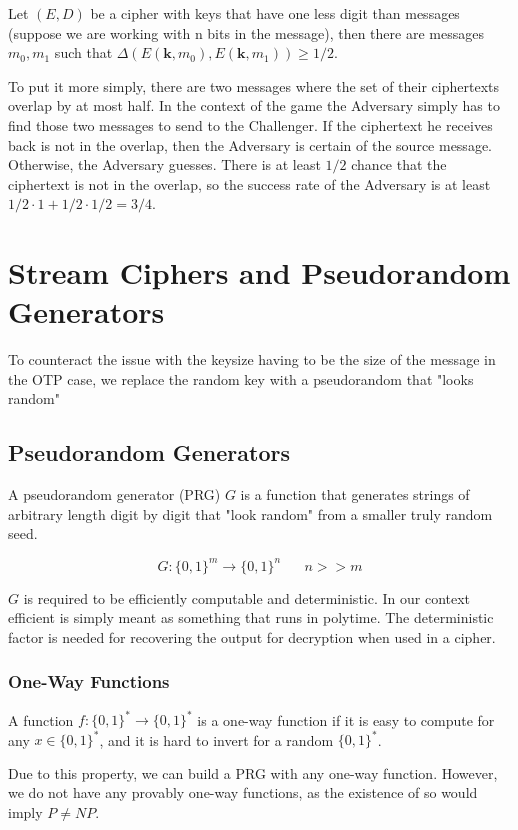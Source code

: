 \documentclass{article}
\begin{document}
\begin{multicols}{2}
Let $(E,D)$ be a cipher with keys that have one less digit than messages (suppose we are working with n bits in the message), then there are messages $m_0, m_1$ such that $\Delta(E(\mathbf{k},m_0), E(\mathbf{k},m_1)) \geq 1/2$.

To put it more simply, there are two messages where the set of their ciphertexts overlap by at most half. In the context of the game the Adversary simply has to find those two messages to send to the Challenger. If the ciphertext he receives back is not in the overlap, then the Adversary is certain of the source message. Otherwise, the Adversary guesses. There is at least $1/2$ chance that the ciphertext is not in the overlap, so the success rate of the Adversary is at least $1/2 \cdot 1 + 1/2 \cdot 1/2 = 3/4$.


\section {Stream Ciphers and Pseudorandom Generators}

To counteract the issue with the keysize having to be the size of the message in the OTP case, we replace the random key with a pseudorandom that "looks random"

\subsection {Pseudorandom Generators}

A pseudorandom generator (PRG) $G$ is a function that generates strings of arbitrary length digit by digit that "look random" from a smaller truly random seed.

$$
G: \{0,1\}^m \rightarrow \{0,1\}^n\;\;\;\;\;\; n >> m
$$

$G$ is required to be efficiently computable and deterministic. In our context efficient is simply meant as something that runs in polytime. The deterministic factor is needed for recovering the output for decryption when used in a cipher. 

\subsubsection{One-Way Functions}

A function $f: \{0,1\}^* \rightarrow \{0,1\}^*$ is a one-way function if it is easy to compute for any $x \in \{0,1\}^*$, and it is hard to invert for a random $\{0,1\}^*$. 

Due to this property, we can build a PRG with any one-way function. However, we do not have any provably one-way functions, as the existence of so would imply $P \neq NP$.


\end{multicols}
\end{document}
